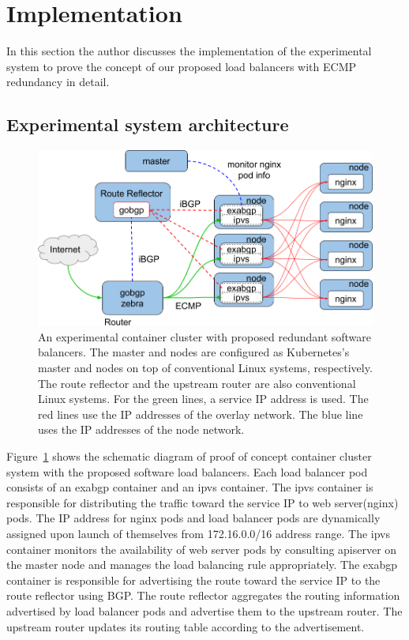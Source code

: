 \section{Implementation}

In this section the author discusses the implementation of the experimental system to prove the concept of our proposed load balancers with ECMP redundancy in detail.

\subsection{Experimental system architecture}\label{sec:poc}

\begin{figure}[tb]
\centering
\includegraphics[width=0.8\columnwidth]{Figs/poc.png}

\par\bigskip
\centering
\begin{minipage}{0.9\columnwidth}
  \caption[An experimental container cluster with proposed redundant software balancers]{
    An experimental container cluster with proposed redundant software balancers.
    The master and nodes are configured as Kubernetes's master and nodes on top of conventional Linux systems, respectively.
    The route reflector and the upstream router are also conventional Linux systems.
    For the green lines, a service IP address is used. The red lines use the IP addresses of the overlay network. The blue line uses the IP addresses of the node network.
  }
  \label{fig:poc}
\end{minipage}

\end{figure}

Figure~\ref{fig:poc} shows the schematic diagram of proof of concept container cluster system with the proposed software load balancers.
%
Each load balancer pod consists of an exabgp\cite{exa-networks_2018} container and an ipvs container.
The ipvs container is responsible for distributing the traffic toward the service IP to web server(nginx) pods.
The IP address for nginx pods and load balancer pods are dynamically assigned upon launch of themselves from 172.16.0.0/16 address range.
The ipvs container monitors the availability of web server pods by consulting apiserver on the master node and manages the load balancing rule appropriately.
The exabgp container is responsible for advertising the route toward the service IP to the route reflector using BGP.
The route reflector aggregates the routing information advertised by load balancer pods and advertise them to the upstream router.
The upstream router updates its routing table according to the advertisement.

